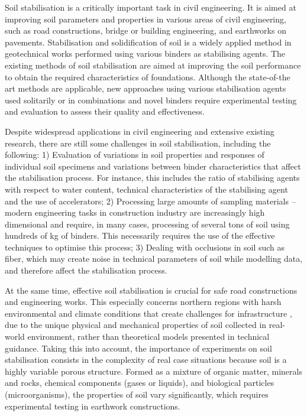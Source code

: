 \documentclass[eprint,
]{actapoly}
\begin{document}
Soil stabilisation is a critically important task in civil engineering. It is aimed at improving soil parameters and properties in various areas of civil engineering, such as road constructions, bridge or building engineering, and earthworks on pavements. Stabilisation and solidification of soil is a widely applied method in geotechnical works performed using various binders as stabilising agents. The existing methods of soil stabilisation are aimed at improving the soil performance to obtain the required characteristics of foundations. Although the state-of-the art methods are applicable, new approaches using various stabilisation agents used solitarily or in combinations and novel binders require experimental testing and evaluation to assess their quality and effectiveness. 

Despite widespread applications in civil engineering and extensive existing research, there are still some challenges in soil stabilisation, including the following: 1) Evaluation of variations in soil properties and responses of individual soil specimens and variations between binder characteristics that affect the stabilisation process. For instance, this includes the ratio of stabilising agents with respect to water content, technical characteristics of the stabilising agent and the use of accelerators; 2) Processing large amounts of sampling materials – modern engineering tasks in construction industry are increasingly high dimensional and require, in many cases, processing of several tons of soil using hundreds of kg of binders. This necessarily requires the use of the effective techniques to optimise this process; 3) Dealing with occlusions in soil such as fiber, which may create noise in technical parameters of soil while modelling data, and therefore affect the stabilisation process. 

At the same time, effective soil stabilisation is crucial for safe road constructions and engineering works. This especially concerns northern regions with harsh environmental and climate conditions that create challenges for infrastructure \citep{Dahlinetal1999,ROTHHAMEL2022100735,Lindh2004,VESTIN2018146,Lemenkov2021a,Lemenkov2021b,Eigenbrod}, due to the unique physical and mechanical properties of soil collected in real-world environment, rather than theoretical models presented in technical guidance. Taking this into account, the importance of experiments on soil stabilisation consists in the complexity of real case situations because soil is a highly variable porous structure. Formed as a mixture of organic matter, minerals and rocks, chemical components (gases or liquids), and biological particles (microorganisms), the properties of soil vary significantly, which requires experimental testing in earthwork constructions. 
\end{document}
